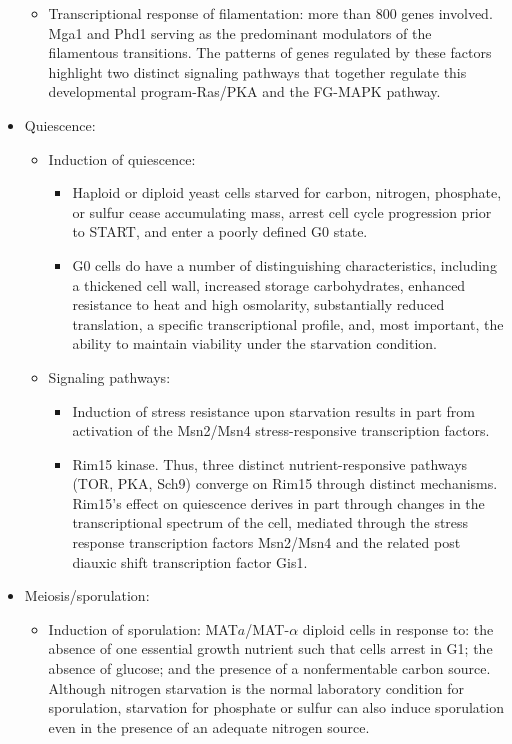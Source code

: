 \documentclass{report}
\begin{document}
\begin{itemize}
\begin{itemize}
	\item Transcriptional response of filamentation: more than 800 genes involved. Mga1 and Phd1 serving as the predominant modulators of the filamentous transitions. The patterns of genes regulated by these factors highlight two distinct signaling pathways that together regulate this developmental program-Ras/PKA and the FG-MAPK pathway.
	
\end{itemize}

\item Quiescence: 
\begin{itemize}
	\item Induction of quiescence: 
	\begin{itemize}
		\item Haploid or diploid yeast cells starved for carbon, nitrogen, phosphate, or sulfur cease accumulating mass, arrest cell cycle progression prior to START, and enter a poorly defined G0 state.
		\item G0 cells do have a number of distinguishing characteristics, including a thickened cell wall, increased storage carbohydrates, enhanced resistance to heat and high osmolarity, substantially reduced translation, a specific transcriptional profile, and, most important, the ability to maintain viability under the starvation condition. 
	\end{itemize}
	
	\item Signaling pathways: 
	\begin{itemize}
		\item Induction of stress resistance upon starvation results in part from activation of the Msn2/Msn4 stress-responsive transcription factors.
		\item Rim15 kinase. Thus, three distinct nutrient-responsive pathways (TOR, PKA, Sch9) converge on Rim15 through distinct mechanisms. Rim15's effect on quiescence derives in part through changes in the transcriptional spectrum of the cell, mediated through the stress response transcription factors Msn2/Msn4 and the related post diauxic shift transcription factor Gis1.
	\end{itemize}
\end{itemize}

\item Meiosis/sporulation: 
\begin{itemize}
	\item Induction of sporulation: MAT$a$/MAT-$\alpha$ diploid cells in response to: the absence of one essential growth nutrient such that cells arrest in G1; the absence of glucose; and the presence of a nonfermentable carbon source. Although nitrogen starvation is the normal laboratory condition for sporulation, starvation for phosphate or sulfur can also induce sporulation even in the presence of an adequate nitrogen source. 
	

\end{itemize}
\end{itemize}
\end{document}
